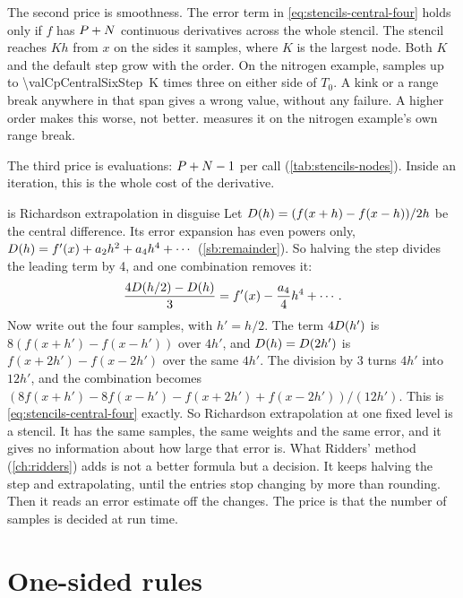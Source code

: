 The second price is smoothness. The error term in \cref{eq:stencils-central-four} holds only if $f$ has
$P + N$ continuous derivatives across the whole stencil. The stencil reaches $K h$ from $x$ on the sides
it samples, where $K$ is the largest node. Both $K$ and the default step grow with the order. On the nitrogen
example,  samples up to \SI{\valCpCentralSixStep}{\kelvin} times three on either side of $T_0$. A
kink or a range break anywhere in that span gives a wrong value, without any failure. A higher order makes this
worse, not better.  measures it on the nitrogen example's own range break.

The third price is evaluations: $P + N - 1$ per call (\cref{tab:stencils-nodes}). Inside an iteration,
this is the whole cost of the derivative.

\begin{sidebar}[label=sb:richardson-disguise]{ is Richardson extrapolation in disguise}
Let $D(h) = (f(x + h) - f(x - h)) / 2h$ be the central difference. Its error expansion has even powers only,
$D(h) = f'(x) + a_2 h^2 + a_4 h^4 + \cdots$ (\cref{sb:remainder}). So halving the step divides the leading term by
4, and one combination removes it:
\[
  \frac{4 D(h/2) - D(h)}{3} = f'(x) - \frac{a_4}{4} h^4 + \cdots .
\]
Now write out the four samples, with $h' = h/2$. The term $4 D(h')$ is $8 (f(x + h') - f(x - h'))$ over $4h'$,
and $D(h) = D(2h')$ is $f(x + 2h') - f(x - 2h')$ over the same $4h'$. The division by 3 turns $4h'$ into $12h'$,
and the combination becomes $(8 f(x + h') - 8 f(x - h') - f(x + 2h') + f(x - 2h')) / (12 h')$. This is
\cref{eq:stencils-central-four} exactly. So Richardson extrapolation at one fixed level is a stencil. It has the same
samples, the same weights and the same error, and it gives no information about how large that error is. What
Ridders' method (\cref{ch:ridders}) adds is not a better formula but a decision. It keeps halving the step and
extrapolating, until the entries stop changing by more than rounding. Then it reads an error estimate off the
changes. The price is that the number of samples is decided at run time.
\end{sidebar}

\section{One-sided rules}\label{sec:stencils-one-sided}

\begin{figure}
\centering

\end{figure}

